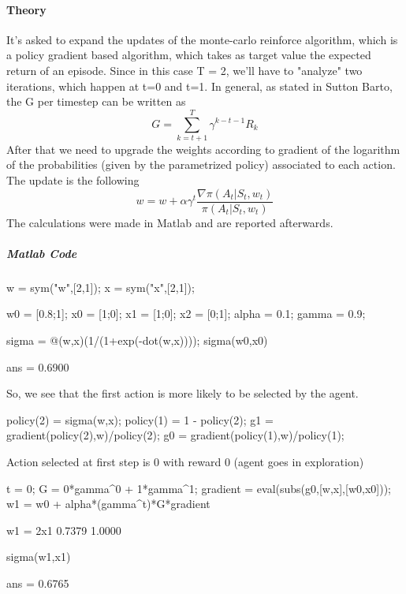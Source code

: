 \documentclass[12pt,a4paper]{extarticle}
\begin{document}
\paragraph{Theory}

It's asked to expand the updates of the monte-carlo reinforce algorithm, which is a policy gradient based algorithm, which takes as target value the expected return of an episode. Since in this case T = 2, we'll have to "analyze" two iterations, which happen at t=0 and t=1. In general, as stated in Sutton Barto, the G per timestep can be written as \[G = \sum_{k=t+1}^T \gamma ^{k-t-1} R_k\] After that we need to upgrade the weights according to gradient of the logarithm of the probabilities (given by the parametrized policy) associated to each action. The update is the following \[w = w + \alpha \gamma ^t  \frac{\nabla \pi (A_t | S_t,w_t)}{\pi (A_t | S_t,w_t)}\] The calculations were made in Matlab and are reported afterwards.

\subparagraph{Matlab Code}

\begin{matlabcode}
w = sym("w",[2,1]);
x = sym("x",[2,1]);

w0 = [0.8;1]; x0 = [1;0]; x1 = [1;0]; x2 = [0;1];
alpha = 0.1; gamma = 0.9;

sigma = @(w,x)(1/(1+exp(-dot(w,x)))); 
sigma(w0,x0) %
\end{matlabcode}
\begin{matlaboutput}
ans = 0.6900
\end{matlaboutput}

So, we see that the first action is more likely to be selected by the agent.


\begin{matlabcode}
policy(2) = sigma(w,x);     %
policy(1) = 1 - policy(2);  %
g1 = gradient(policy(2),w)/policy(2); %
g0 = gradient(policy(1),w)/policy(1); %
\end{matlabcode}


\begin{par}
\begin{flushleft}
Action selected at first step is 0 with reward 0 (agent goes in exploration) 
\end{flushleft}
\end{par}

\begin{matlabcode}
t = 0; 
G = 0*gamma^0 + 1*gamma^1;
gradient = eval(subs(g0,[w,x],[w0,x0]));
w1 = w0 + alpha*(gamma^t)*G*gradient
\end{matlabcode}
\begin{matlaboutput}
w1 = 2x1    
    0.7379
    1.0000

\end{matlaboutput}
\begin{matlabcode}
sigma(w1,x1)
\end{matlabcode}
\begin{matlaboutput}
ans = 0.6765
\end{matlaboutput}
\end{document}
